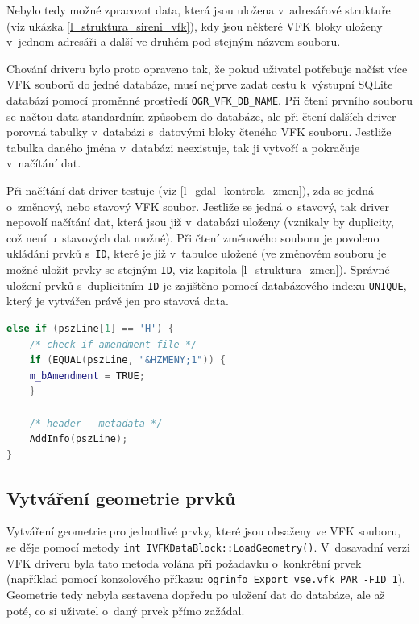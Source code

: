 \documentclass[a4paper,12pt,oneside]{book}
\begin{document}
Nebylo tedy možné zpracovat data, která jsou uložena v~adresářové struktuře (viz ukázka \ref{l_struktura_sireni_vfk}), kdy jsou některé VFK bloky uloženy v~jednom adresáři a další ve druhém pod stejným názvem souboru.

Chování driveru bylo proto opraveno tak, že pokud uživatel potřebuje načíst více VFK souborů do jedné databáze, musí nejprve zadat cestu k~výstupní SQLite databází pomocí proměnné prostředí \texttt{OGR\_VFK\_DB\_NAME}. Při čtení prvního souboru se načtou data standardním způsobem do databáze, ale při čtení dalších driver porovná tabulky v~databázi s~datovými bloky čteného VFK souboru. Jestliže tabulka daného jména v~databázi neexistuje, tak ji vytvoří a pokračuje v~načítání dat. 

Při načítání dat driver testuje (viz \ref{l_gdal_kontrola_zmen}), zda se jedná o~změnový, nebo stavový VFK soubor. Jestliže se jedná o~stavový, tak driver nepovolí načítání dat, která jsou již v~databázi uloženy (vznikaly by duplicity, což není u~stavových dat možné). Při čtení změnového souboru je povoleno ukládání prvků s~\texttt{ID}, které je již v~tabulce uložené (ve změnovém souboru je možné uložit prvky se stejným \texttt{ID}, viz kapitola \ref{l_struktura_zmen}). Správné uložení prvků s~duplicitním \texttt{ID} je zajištěno pomocí databázového indexu \texttt{UNIQUE}, který je vytvářen právě jen pro stavová data.

\begin{lstlisting}[language=C++, 
		    caption={Výňatek z~kódu pro kontrolu změnového souboru}, 
		    keywordstyle=\color{blue}\ttfamily,
		    stringstyle=\color{red}\ttfamily,
		    commentstyle=\color{green}\ttfamily, 
		    morekeywords={AddInfo, EQUAL},
		    label=l_gdal_kontrola_zmen]
else if (pszLine[1] == 'H') {
    /* check if amendment file */
    if (EQUAL(pszLine, "&HZMENY;1")) {
	m_bAmendment = TRUE;
    }

    /* header - metadata */
    AddInfo(pszLine);
}
\end{lstlisting}

\subsection{Vytváření geometrie prvků}
Vytváření geometrie pro jednotlivé prvky, které jsou obsaženy ve VFK souboru, se děje pomocí metody \texttt{int IVFKDataBlock::LoadGeometry()}. V~dosavadní verzi VFK driveru byla tato metoda volána při požadavku o~konkrétní prvek (například pomocí konzolového příkazu: \texttt{ogrinfo Export\_vse.vfk PAR -FID 1}). Geometrie tedy nebyla sestavena dopředu po uložení dat do databáze, ale až poté, co si uživatel o~daný prvek přímo zažádal.
\end{document}
